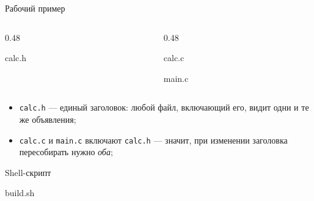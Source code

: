 \documentclass[compress, 8pt, aspectratio=169]{beamer}
\begin{document}
\begin{frame}[fragile]{Рабочий пример}

  \begin{columns}[T]

    \begin{column}{0.48\textwidth}

        {calc.h}

    \end{column}

    \begin{column}{0.48\textwidth}

        {calc.c}

        {main.c}

    \end{column}

  \end{columns}

  \bigbreak

  \begin{itemize}

    \item \texttt{calc.h} --- единый заголовок: любой файл,
      включающий его, видит одни и те же объявления;

    \item \texttt{calc.c} и \texttt{main.c} включают
      \texttt{calc.h} --- значит, при изменении заголовка
      пересобирать нужно \textit{оба};

  \end{itemize}

\end{frame}

\begin{frame}[fragile]{Shell-скрипт}

    {build.sh}

\end{frame}
\end{document}
